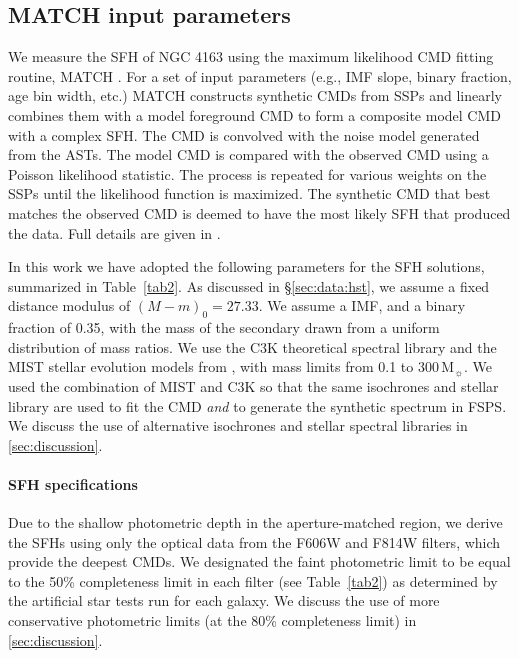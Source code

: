 \documentclass[preprint2]{aastex62}
\newcommand\Msun{\ensuremath{\,\mathrm{M_{\sun}}}\xspace}
\newcommand{\dmod}{\ensuremath{(M - m)_0}\xspace}
\begin{document}
\subsection{MATCH input parameters}\label{sec:methods:match}

We measure the SFH of NGC 4163 using the maximum likelihood CMD fitting routine, MATCH \citep{Dolphin+2002}. For a set of input parameters (e.g., IMF slope, binary fraction, age bin width, etc.) MATCH constructs synthetic CMDs from SSPs and linearly combines them with a model foreground CMD to form a composite model CMD with a complex SFH. The CMD is convolved with the noise model generated from the ASTs. The model CMD is compared with the observed CMD using a Poisson likelihood statistic. The process is repeated for various weights on the SSPs until the likelihood function is maximized. The synthetic CMD that best matches the observed CMD is deemed to have the most likely SFH that produced the data. Full details are given in \citet{Dolphin+2002}.

In this work we have adopted the following parameters for the SFH solutions, summarized in Table~\ref{tab2}. As discussed in \S\ref{sec:data:hst}, we assume a fixed distance modulus of $\dmod = 27.33$. We assume a \citet{Chabrier+2003} IMF, and a binary fraction of 0.35, with the mass of the secondary drawn from a uniform distribution of mass ratios. We use the C3K theoretical spectral library and the MIST stellar evolution models from \citet{Choi+2016, Dotter+2016}, with mass limits from 0.1 to 300\Msun. We used the combination of MIST and C3K so that the same isochrones and stellar library are used to fit the CMD \emph{and} to generate the synthetic spectrum in FSPS. We discuss the use of alternative isochrones and stellar spectral libraries in \ref{sec:discussion}.

\paragraph{SFH specifications}

Due to the shallow photometric depth in the aperture-matched region, we derive the SFHs using only the optical data from the F606W and F814W filters, which provide the deepest CMDs. We designated the faint photometric limit to be equal to the 50\% completeness limit in each filter (see Table~\ref{tab2}) as determined by the artificial star tests run for each galaxy. We discuss the use of more conservative photometric limits (at the 80\% completeness limit) in \ref{sec:discussion}.
\end{document}
